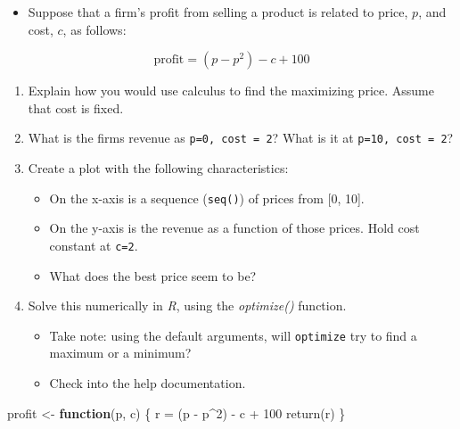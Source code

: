 \documentclass[
]{book}
\newenvironment{Shaded}{\begin{snugshade}}{\end{snugshade}}
\newcommand{\ControlFlowTok}[1]{\textcolor[rgb]{0.13,0.29,0.53}{\textbf{#1}}}
\newcommand{\DecValTok}[1]{\textcolor[rgb]{0.00,0.00,0.81}{#1}}
\newcommand{\FunctionTok}[1]{\textcolor[rgb]{0.00,0.00,0.00}{#1}}
\newcommand{\NormalTok}[1]{#1}
\newcommand{\OtherTok}[1]{\textcolor[rgb]{0.56,0.35,0.01}{#1}}
\newcommand{\SpecialCharTok}[1]{\textcolor[rgb]{0.00,0.00,0.00}{#1}}
\providecommand{\tightlist}{%
  \setlength{\itemsep}{0pt}\setlength{\parskip}{0pt}}
\theoremstyle{definition}
\theoremstyle{definition}
\theoremstyle{definition}
\theoremstyle{definition}
\theoremstyle{remark}
\begin{document}
\begin{itemize}
\tightlist
\item
  Suppose that a firm's profit from selling a product is related to price, \(p\), and cost, \(c\), as follows:
\end{itemize}

\[ 
\text{profit} = (p - p^2) - c + 100
\]

\begin{enumerate}
\def\labelenumi{\arabic{enumi}.}
\item
  Explain how you would use calculus to find the maximizing price. Assume that cost is fixed.
\item
  What is the firms revenue as \texttt{p=0,\ cost\ =\ 2}? What is it at \texttt{p=10,\ cost\ =\ 2}?
\item
  Create a plot with the following characteristics:

  \begin{itemize}
  \tightlist
  \item
    On the x-axis is a sequence (\texttt{seq()}) of prices from {[}0, 10{]}.
  \item
    On the y-axis is the revenue as a function of those prices. Hold cost constant at \texttt{c=2}.\\
  \item
    What does the best price seem to be?
  \end{itemize}
\item
  Solve this numerically in \emph{R}, using the \emph{optimize()} function.

  \begin{itemize}
  \tightlist
  \item
    Take note: using the default arguments, will \texttt{optimize} try to find a maximum or a minimum?
  \item
    Check into the help documentation.
  \end{itemize}
\end{enumerate}

\begin{Shaded}
\begin{Highlighting}[]
\NormalTok{profit }\OtherTok{\textless{}{-}} \ControlFlowTok{function}\NormalTok{(p, c) \{ }
\NormalTok{  r }\OtherTok{=}\NormalTok{ (p }\SpecialCharTok{{-}}\NormalTok{ p}\SpecialCharTok{\^{}}\DecValTok{2}\NormalTok{) }\SpecialCharTok{{-}}\NormalTok{ c }\SpecialCharTok{+} \DecValTok{100}
  \FunctionTok{return}\NormalTok{(r) }
\NormalTok{  \} }
\end{Highlighting}
\end{Shaded}
\end{document}
